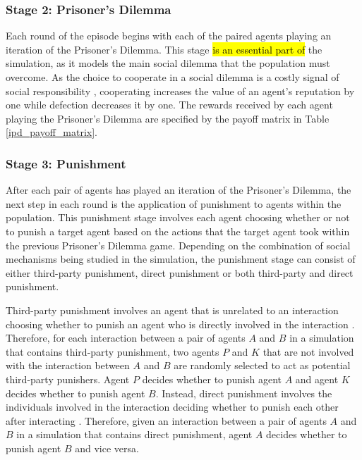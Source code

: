 \documentclass[sn-aps,numbered]{sn-jnl}%
\theoremstyle{thmstyleone}%
\theoremstyle{thmstyletwo}%
\theoremstyle{thmstylethree}%
\begin{document}
\subsubsection{Stage 2: Prisoner's Dilemma}

Each round of the episode begins with each of the paired agents playing an iteration of the Prisoner's Dilemma. This stage \hl{is an essential part of} the simulation, as it models the main social dilemma that the population must overcome. As the choice to cooperate in a social dilemma is a costly signal of social responsibility \citep{language_of_coop, networks_reliable_rep_coop_review, mirco_partner_selection}, cooperating increases the value of an agent's reputation by one while defection decreases it by one. The rewards received by each agent playing the Prisoner's Dilemma are specified by the payoff matrix in Table \ref{ipd_payoff_matrix}.

\subsubsection{Stage 3: Punishment\label{punishment_step}}

After each pair of agents has played an iteration of the Prisoner's Dilemma, the next step in each round is the application of punishment to agents within the population. This punishment stage involves each agent choosing whether or not to punish a target agent based on the actions that the target agent took within the previous Prisoner's Dilemma game. Depending on the combination of social mechanisms being studied in the simulation, the punishment stage can consist of either third-party punishment, direct punishment or both third-party and direct punishment.

Third-party punishment involves an agent that is unrelated to an interaction choosing whether to punish an agent who is directly involved in the interaction \citep{Redhead2021, tpp_4_year_olds}. Therefore, for each interaction between a pair of agents $A$ and $B$ in a simulation that contains third-party punishment, two agents $P$ and $K$ that are not involved with the interaction between $A$ and $B$ are randomly selected to act as potential third-party punishers. Agent $P$ decides whether to punish agent $A$ and agent $K$ decides whether to punish agent $B$. Instead, direct punishment involves the individuals involved in the interaction deciding whether to punish each other after interacting \citep{molho2020direct}. Therefore, given an interaction between a pair of agents $A$ and $B$ in a simulation that contains direct punishment, agent $A$ decides whether to punish agent $B$ and vice versa.
\end{document}
